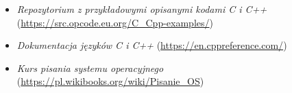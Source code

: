 % 
% 
% 
% 

\begin{itemize}
\item \emph{Repozytorium z przykładowymi opisanymi kodami C i C++} (\url{https://src.opcode.eu.org/C\_Cpp-examples/})
\item \emph{Dokumentacja języków C i C++} (\url{https://en.cppreference.com/})
\item \emph{Kurs pisania systemu operacyjnego} (\url{https://pl.wikibooks.org/wiki/Pisanie_OS})
\end{itemize}
